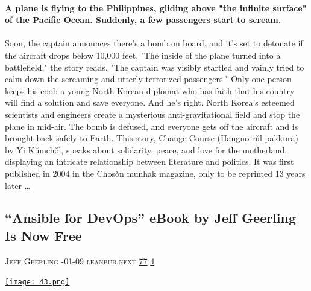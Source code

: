 \documentclass[10pt,a4paper]{article}
\begin{document}
\begin{multicols}{2}
\paragraph{}
\textbf{A plane is flying to the Philippines, gliding above "the infinite surface" of the Pacific Ocean. Suddenly, a few passengers start to scream.}
\paragraph{}
 Soon, the captain announces there's a bomb on board, and it’s set to detonate if the aircraft drops below 10,000 feet.
"The inside of the plane turned into a battlefield," the story reads. "The captain was visibly startled and vainly tried to calm down the screaming and utterly terrorized passengers."
Only one person keeps his cool: a young North Korean diplomat who has faith that his country will find a solution and save everyone. And he’s right. North Korea's esteemed scientists and engineers create a mysterious anti-gravitational field and stop the plane in mid-air. The bomb is defused, and everyone gets off the aircraft and is brought back safely to Earth.
This story, Change Course (Hangno rǔl pakkura) by Yi Kŭmchǒl, speaks about solidarity, peace, and love for the motherland, displaying an intricate relationship between literature and politics. It was first published in 2004 in the Chosǒn munhak magazine, only to be reprinted 13 years later
\dots\par
\noindent\begin{minipage}{\linewidth}
\medskip
\subsection{“Ansible for DevOps” eBook by Jeff Geerling Is Now Free}
\textsc{\footnotesize
{\scriptsize\faUser}\space 
Jeff Geerling 
{\scriptsize\faCalendar}-01-09 
{\scriptsize\faGlobe}\space 
leanpub.next 
{\scriptsize\faThumbsOUp}\space 
\href{http://news.ycombinator.com/item?id=37331212\&utm\_term=comment}{77} 
{\scriptsize\faComments}\space 
\href{http://news.ycombinator.com/item?id=37331212\&utm\_term=comment}{4} 
}
\par\medskip\noindent
\href{https://leanpub.com/ansible-for-devops/c/CTVMPCbEeXd3?utm\_source=hackernewsletter\&utm\_medium=email\&utm\_term=books}{
    \texttt{[image: 43.png]}
}
\end{minipage}

\end{multicols}
\end{document}
